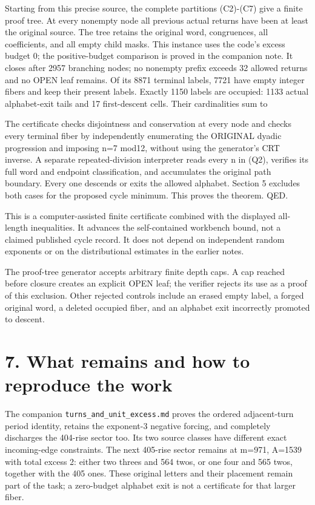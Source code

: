 Starting from this precise source, the complete partitions (C2)-(C7)
give a finite proof tree. At every nonempty node all previous actual
returns have been at least the original source. The tree retains the
original word, congruences, all coefficients, and all empty child masks.
This instance uses the code's excess budget 0; the positive-budget
comparison is proved in the companion note. It closes after 2957
branching nodes; no nonempty prefix exceeds 32 allowed returns and no
OPEN leaf remains. Of its 8871 terminal labels, 7721 have empty integer
fibers and keep their present labels. Exactly 1150 labels are occupied:
1133 actual alphabet-exit tails and 17 first-descent cells. Their
cardinalities sum to


The certificate checks disjointness and conservation at every node and
checks every terminal fiber by independently enumerating the ORIGINAL
dyadic progression and imposing n=7 mod12, without using the generator's
CRT inverse. A separate repeated-division interpreter reads every n in
(Q2), verifies its full word and endpoint classification, and
accumulates the original path boundary. Every one descends or exits the
allowed alphabet. Section 5 excludes both cases for the proposed cycle
minimum. This proves the theorem. QED.

This is a computer-assisted finite certificate combined with the
displayed all-length inequalities. It advances the self-contained
workbench bound, not a claimed published cycle record. It does not
depend on independent random exponents or on the distributional
estimates in the earlier notes.

The proof-tree generator accepts arbitrary finite depth caps. A cap
reached before closure creates an explicit OPEN leaf; the verifier
rejects its use as a proof of this exclusion. Other rejected controls
include an erased empty label, a forged original word, a deleted
occupied fiber, and an alphabet exit incorrectly promoted to descent.

\section{7. What remains and how to reproduce the work}

The companion \nolinkurl{turns_and_unit_excess.md} proves the ordered
adjacent-turn period identity, retains the exponent-3 negative forcing,
and completely discharges the 404-rise sector too. Its two source
classes have different exact incoming-edge constraints. The next
405-rise sector remains at m=971, A=1539 with total excess 2: either two
threes and 564 twos, or one four and 565 twos, together with the 405
ones. These original letters and their placement remain part of the
task; a zero-budget alphabet exit is not a certificate for that larger
fiber.

